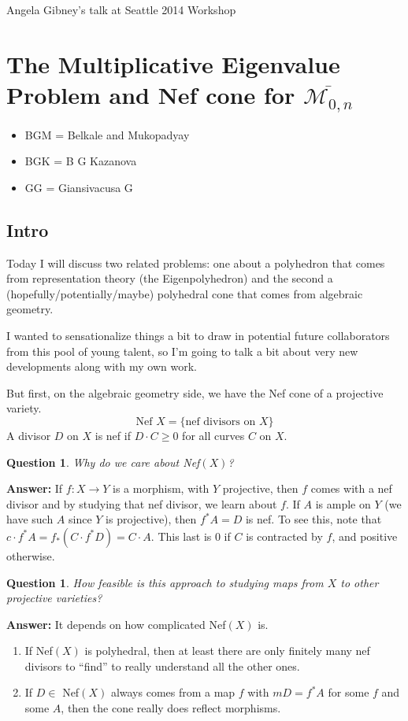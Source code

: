 \documentclass[12pt]{article}
\newcommand{\MM}{\mathcal{M}}
\newtheorem{question}[theorem]{Question}
\begin{document}
Angela Gibney's talk at Seattle 2014 Workshop

\section{The Multiplicative Eigenvalue Problem and Nef cone for $\overline{\MM_{0,n}}$}

\begin{itemize}
\item BGM = Belkale and Mukopadyay
\item BGK = B G Kazanova
\item GG = Giansivacusa G
\end{itemize}

\subsection{Intro}
Today I will discuss two related problems: one about a polyhedron that comes from representation theory (the Eigenpolyhedron) and the second a (hopefully/potentially/maybe) polyhedral cone that comes from algebraic geometry.

I wanted to sensationalize things a bit to draw in potential future collaborators from this pool of young talent, so  I'm going to talk a bit about very new developments along with my own work.

But first, on the algebraic geometry side, we have the Nef cone of a projective variety.
\[ \text{Nef } X = \{ \text{nef divisors on } X \} \]
A divisor $D$ on $X$ is nef if $D \cdot C \geq 0$ for all curves $C$ on $X$.

\begin{question}
Why do we care about Nef$(X)$?
\end{question}
\textbf{Answer:} If $f: X \to Y$ is a morphism, with $Y$ projective, then $f$ comes with a nef divisor and by studying that nef divisor, we learn about $f$.  If $A$ is ample on $Y$ (we have such $A$ since $Y$ is projective), then $f^{\ast}A = D$ is nef.  To see this, note that $c \cdot f^{\ast}A = f_{\ast}(C \cdot f^{\ast} D) = C \cdot A$.  This last is $0$ if $C$ is contracted by $f$, and positive otherwise.

\begin{question}
How feasible is this approach to studying maps from $X$ to other projective varieties?
\end{question}
\textbf{Answer:} It depends on how complicated Nef$(X)$ is.  
\begin{enumerate}
\item If Nef$(X)$ is polyhedral, then at least there are only finitely many nef divisors to ``find'' to really understand all the other ones.

\item If $D \in $ Nef$(X)$ always comes from a map $f$ with $mD = f^{\ast}A$ for some $f$ and some $A$, then the cone really does reflect morphisms.
\end{enumerate}
\end{document}
